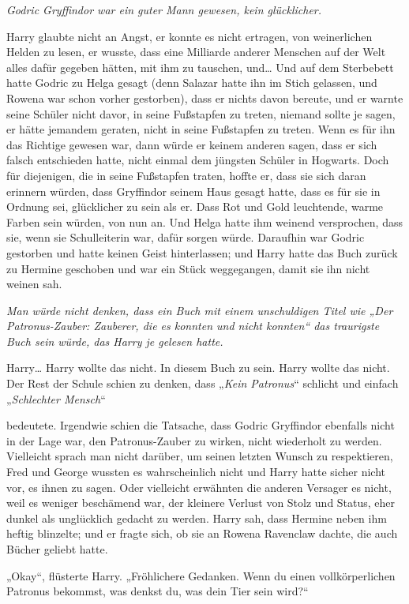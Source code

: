 {\emph{Godric Gryffindor war ein guter Mann gewesen, kein glücklicher.}

Harry glaubte nicht an Angst, er konnte es nicht ertragen, von weinerlichen Helden zu lesen, er wusste, dass eine Milliarde anderer Menschen auf der Welt alles dafür gegeben hätten, mit ihm zu tauschen, und… Und auf dem Sterbebett hatte Godric zu Helga gesagt (denn Salazar hatte ihn im Stich gelassen, und Rowena war schon vorher gestorben), dass er nichts davon bereute, und er warnte seine Schüler nicht davor, in seine Fußstapfen zu treten, niemand sollte je sagen, er hätte jemandem geraten, nicht in seine Fußstapfen zu treten. Wenn es für ihn das Richtige gewesen war, dann würde er keinem anderen sagen, dass er sich falsch entschieden hatte, nicht einmal dem jüngsten Schüler in Hogwarts. Doch für diejenigen, die in seine Fußstapfen traten, hoffte er, dass sie sich daran erinnern würden, dass Gryffindor seinem Haus gesagt hatte, dass es für sie in Ordnung sei, glücklicher zu sein als er. Dass Rot und Gold leuchtende, warme Farben sein würden, von nun an. Und Helga hatte ihm weinend versprochen, dass sie, wenn sie Schulleiterin war, dafür sorgen würde. Daraufhin war Godric gestorben und hatte keinen Geist hinterlassen; und Harry hatte das Buch zurück zu Hermine geschoben und war ein Stück weggegangen, damit sie ihn nicht weinen sah.

\emph{Man würde nicht denken, dass ein Buch mit einem unschuldigen Titel wie „Der Patronus-Zauber: Zauberer, die es konnten und nicht konnten“ das traurigste Buch sein würde, das Harry je gelesen hatte.}

Harry… Harry wollte das nicht. In diesem Buch zu sein. Harry wollte das nicht. Der Rest der Schule schien zu denken, dass „\emph{Kein Patronus}“ schlicht und einfach „\emph{Schlechter Mensch}“

bedeutete. Irgendwie schien die Tatsache, dass Godric Gryffindor ebenfalls nicht in der Lage war, den Patronus-Zauber zu wirken, nicht wiederholt zu werden. Vielleicht sprach man nicht darüber, um seinen letzten Wunsch zu respektieren, Fred und George wussten es wahrscheinlich nicht und Harry hatte sicher nicht vor, es ihnen zu sagen. Oder vielleicht erwähnten die anderen Versager es nicht, weil es weniger beschämend war, der kleinere Verlust von Stolz und Status, eher dunkel als unglücklich gedacht zu werden. Harry sah, dass Hermine neben ihm heftig blinzelte; und er fragte sich, ob sie an Rowena Ravenclaw dachte, die auch Bücher geliebt hatte.

„Okay“, flüsterte Harry. „Fröhlichere Gedanken. Wenn du einen vollkörperlichen Patronus bekommst, was denkst du, was dein Tier sein wird?“

}
